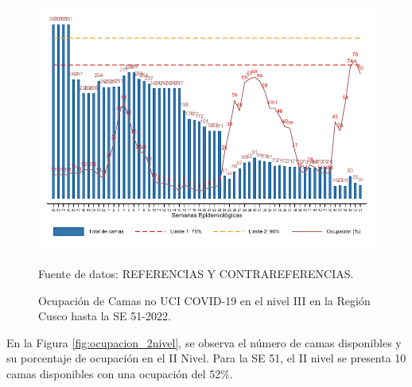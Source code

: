 \documentclass[12pt,a4paper,openany]{book}
\begin{document}
	\begin{figure}[htpb]
		\caption{Ocupación de Camas no UCI COVID-19 en el nivel III en la Región Cusco hasta la SE 51-2022.}\label{fig:ocupacion_3_nivel}
		\begin{center}
			\includegraphics[width=0.95\linewidth]{../figuras/nivel_3.pdf}
		\end{center}
		{\footnotesize {Fuente de datos: REFERENCIAS Y CONTRAREFERENCIAS.}}
	\end{figure}
	
	\clearpage
	
	En la Figura \ref{fig:ocupacion_2nivel}, se observa el número de camas disponibles y su porcentaje de ocupación en el II Nivel. Para la SE 51, el II nivel se presenta 10 camas disponibles con una ocupación del 52$\%$.
	
\end{document}
